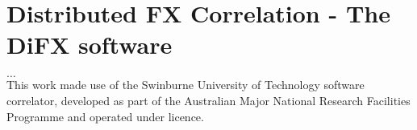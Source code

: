 
\chapter{Distributed FX Correlation - The DiFX software} %

\label{Chapter4} %



$\ldots$ \\
This work made use of the Swinburne University of Technology software correlator, developed as part of the Australian Major National Research Facilities Programme and operated under licence.